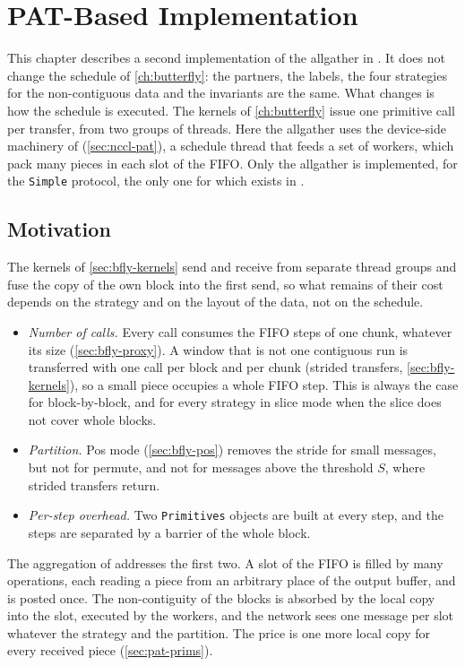 \chapter{PAT-Based Implementation}\label{ch:pat}

This chapter describes a second implementation of the \bine{} allgather in \nccl{}.
It does not change the schedule of \cref{ch:butterfly}: the partners, the labels, the four strategies for the non-contiguous data and the invariants are the same.
What changes is how the schedule is executed.
The kernels of \cref{ch:butterfly} issue one primitive call per transfer, from two groups of threads. Here the allgather uses the device-side machinery of \pat{} (\cref{sec:nccl-pat}), a schedule thread that feeds a set of workers, which pack many pieces in each slot of the FIFO.
Only the allgather is implemented, for the \texttt{Simple} protocol, the only one for which \pat{} exists in \nccl{}.

\section{Motivation}\label{sec:pat-motivation}

The kernels of \cref{sec:bfly-kernels} send and receive from separate thread groups and fuse the copy of the own block into the first send, so what remains of their cost depends on the strategy and on the layout of the data, not on the schedule.
\begin{itemize}
  \item \emph{Number of calls.} Every call consumes the FIFO steps of one chunk, whatever its size (\cref{sec:bfly-proxy}).
  A window that is not one contiguous run is transferred with one call per block and per chunk (strided transfers, \cref{sec:bfly-kernels}), so a small piece occupies a whole FIFO step. This is always the case for block-by-block, and for every strategy in slice mode when the slice does not cover whole blocks.
  \item \emph{Partition.} Pos mode (\cref{sec:bfly-pos}) removes the stride for small messages, but not for permute, and not for messages above the threshold $S$, where strided transfers return.
  \item \emph{Per-step overhead.} Two \texttt{Primitives} objects are built at every step, and the steps are separated by a barrier of the whole block.
\end{itemize}
The aggregation of \pat{} addresses the first two.
A slot of the FIFO is filled by many operations, each reading a piece from an arbitrary place of the output buffer, and is posted once.
The non-contiguity of the blocks is absorbed by the local copy into the slot, executed by the workers, and the network sees one message per slot whatever the strategy and the partition.
The price is one more local copy for every received piece (\cref{sec:pat-prims}).

